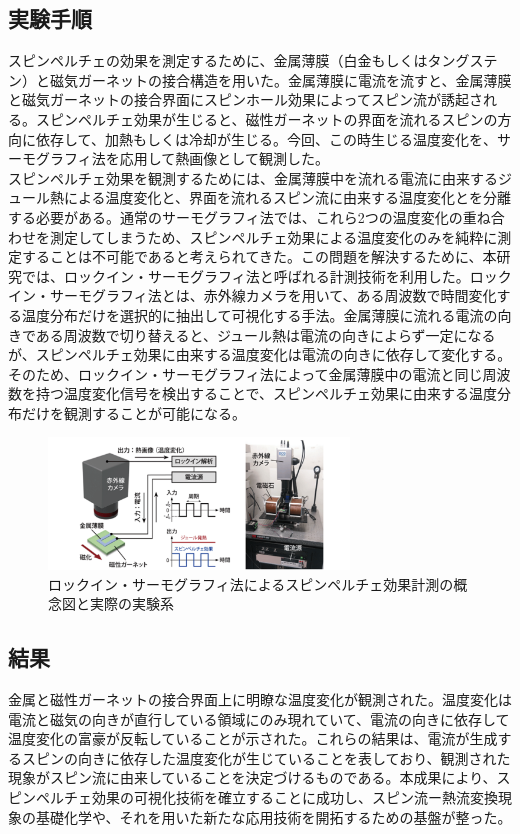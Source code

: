 \documentclass[10pt]{ujarticle}
\begin{document}
\subsection{実験手順}
スピンペルチェの効果を測定するために、金属薄膜（白金もしくはタングステン）と磁気ガーネットの接合構造を用いた。金属薄膜に電流を流すと、金属薄膜と磁気ガーネットの接合界面にスピンホール効果によってスピン流が誘起される。スピンペルチェ効果が生じると、磁性ガーネットの界面を流れるスピンの方向に依存して、加熱もしくは冷却が生じる。今回、この時生じる温度変化を、サーモグラフィ法を応用して熱画像として観測した。\\
スピンペルチェ効果を観測するためには、金属薄膜中を流れる電流に由来するジュール熱による温度変化と、界面を流れるスピン流に由来する温度変化とを分離する必要がある。通常のサーモグラフィ法では、これら2つの温度変化の重ね合わせを測定してしまうため、スピンペルチェ効果による温度変化のみを純粋に測定することは不可能であると考えられてきた。この問題を解決するために、本研究では、ロックイン・サーモグラフィ法と呼ばれる計測技術を利用した。ロックイン・サーモグラフィ法とは、赤外線カメラを用いて、ある周波数で時間変化する温度分布だけを選択的に抽出して可視化する手法。金属薄膜に流れる電流の向きである周波数で切り替えると、ジュール熱は電流の向きによらず一定になるが、スピンペルチェ効果に由来する温度変化は電流の向きに依存して変化する。そのため、ロックイン・サーモグラフィ法によって金属薄膜中の電流と同じ周波数を持つ温度変化信号を検出することで、スピンペルチェ効果に由来する温度分布だけを観測することが可能になる。
\begin{figure}[h]
  \begin{center}
    \includegraphics[width=8cm]{./screenshot2.png}
    \caption{ロックイン・サーモグラフィ法によるスピンペルチェ効果計測の概念図と実際の実験系}
  \end{center}
\end{figure}



\subsection{結果}
金属と磁性ガーネットの接合界面上に明瞭な温度変化が観測された。温度変化は電流と磁気の向きが直行している領域にのみ現れていて、電流の向きに依存して温度変化の富豪が反転していることが示された。これらの結果は、電流が生成するスピンの向きに依存した温度変化が生じていることを表しており、観測された現象がスピン流に由来していることを決定づけるものである。本成果により、スピンペルチェ効果の可視化技術を確立することに成功し、スピン流ー熱流変換現象の基礎化学や、それを用いた新たな応用技術を開拓するための基盤が整った。
\end{document}
